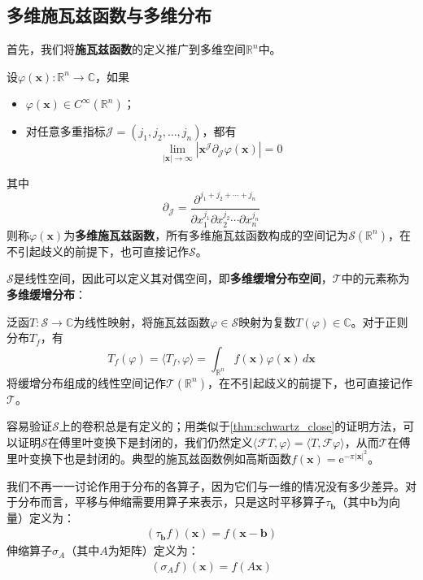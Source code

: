 \subsection{多维施瓦兹函数与多维分布}\label{sub:multi_schwartz}

首先，我们将\textbf{施瓦兹函数}的定义推广到多维空间$\mathbb{R}^n$中。
\begin{definition}[多维施瓦兹函数]
    设$\varphi(\mathbf{x}):\mathbb{R}^n\to\mathbb{C}$，如果\begin{itemize}
        \item $\varphi(\mathbf{x})\in C^{\infty}(\mathbb{R}^n)$；
        \item 对任意多重指标$\mathcal{J}=(j_1,j_2,\ldots,j_n)$，都有
        \[\lim_{|\mathbf{x}|\to\infty}|\mathbf{x}^{\mathcal{J}} \partial_{\mathcal{J}} \varphi(\mathbf{x})|=0\]
    \end{itemize}
    其中$$\partial_{\mathcal{J}}=\frac{\partial^{j_1+j_2+\cdots +j_n}}{\partial x_1^{j_1}\partial x_2^{j_2}\cdots \partial x_n^{j_n}}$$
    则称$\varphi(\mathbf{x})$为\textbf{多维施瓦兹函数}，所有多维施瓦兹函数构成的空间记为$\mathcal{S}(\mathbb{R}^n)$，在不引起歧义的前提下，也可直接记作$\mathcal{S}$。
\end{definition}

$\mathcal{S} $是线性空间，因此可以定义其对偶空间，即\textbf{多维缓增分布空间}，$\mathcal{T} $中的元素称为\textbf{多维缓增分布}：
\begin{definition}[多维缓增分布]
    泛函$T:\mathcal{S} \to \mathbb{C}$为线性映射，将施瓦兹函数$\varphi\in \mathcal{S} $映射为复数$T(\varphi)\in \mathbb{C}$。对于正则分布$T_f$，有
    $$T_f(\varphi)=\langle T_f,\varphi\rangle=\int_{\mathbb{R}^n}f(\mathbf{x})\varphi(\mathbf{x})\,d\mathbf{x}$$
    将缓增分布组成的线性空间记作$\mathcal{T} (\mathbb{R}^n)$，在不引起歧义的前提下，也可直接记作$\mathcal{T} $。
\end{definition}

容易验证$\mathcal{S} $上的卷积总是有定义的；用类似于\cref{thm:schwartz_close}的证明方法，可以证明$\mathcal{S} $在傅里叶变换下是封闭的，我们仍然定义$\langle \mathcal{F} T,\varphi\rangle=\langle T,\mathcal{F} \varphi\rangle$，从而$\mathcal{T} $在傅里叶变换下也是封闭的。典型的施瓦兹函数例如高斯函数$f(\mathbf{x})=\mathrm{e}^{-\pi |\mathbf{x}|^2}$。

我们不再一一讨论作用于分布的各算子，因为它们与一维的情况没有多少差异。对于分布而言，平移与伸缩需要用算子来表示，只是这时平移算子$\tau_{\mathbf{b}}$（其中$\mathbf{b}$为向量）定义为：
\begin{align*}
    (\tau_{\mathbf{b}} f)(\mathbf{x})=f(\mathbf{x}-\mathbf{b})
\end{align*}
伸缩算子$\sigma_A$（其中$A$为矩阵）定义为：
\begin{align*}
    (\sigma_A f)(\mathbf{x})=f(A\mathbf{x})
\end{align*}

